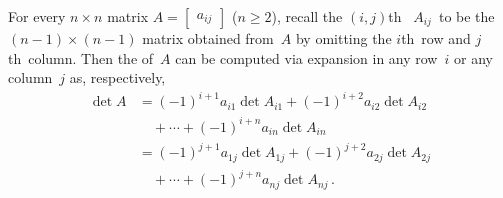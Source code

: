\begin{theorem} \label{thm:letdet} 
For every \(n\times n\) matrix \(A=\begin{bmatrix} a_{ij} \end{bmatrix}\) (\(n\geq2\)), recall the \((i,j)\)th~ \(A_{ij}\)~to be the \((n-1)\times(n-1)\) matrix obtained from~\(A\) by omitting the \(i\)th~row and \(j\)th~column.  
Then the  of~\(A\) can be computed via expansion in any row~\(i\) or any column~\(j\) as, respectively,
\begin{align}
\det A
&=(-1)^{i+1}a_{i1}\det A_{i1}
+(-1)^{i+2}a_{i2}\det A_{i2}
\nonumber\\&\quad{}
+\cdots+(-1)^{i+n}a_{in}\det A_{in}
\nonumber\\&=(-1)^{j+1}a_{1j}\det A_{1j}
+(-1)^{j+2}a_{2j}\det A_{2j}
\nonumber\\&\quad{}
+\cdots+(-1)^{j+n}a_{nj}\det A_{nj}\,.
\label{eq:detlet}
\end{align}
\end{theorem}
